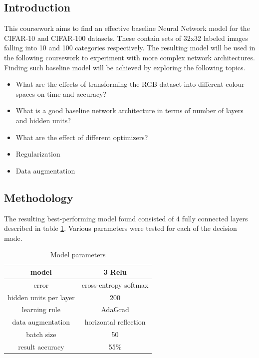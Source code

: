 \documentclass[12pt]{article}
\begin{document}
\maketitle


\subsection*{Introduction}
This coursework aims to find an effective baseline Neural Network model for the CIFAR-10 and CIFAR-100 datasets. These contain sets of 32x32 labeled images falling into 10 and 100 categories respectively. The resulting model will be used in the following coursework to experiment with more complex network architectures. Finding such baseline model will be achieved by exploring the following topics.
\begin{itemize}
\item What are the effects of transforming the RGB dataset into different colour spaces on time and accuracy?
\item What is a good baseline network architecture in terms of number of layers and hidden units?
\item  What are the effect of different optimizers?
\item Regularization
\item Data augmentation  
\end{itemize}

\subsection*{Methodology}

The resulting best-performing model found consisted of 4 fully connected layers described in table \ref{tab:model}. Various parameters were tested for each of the decision made. 

\begin{table}[H]
\centering
\begin{tabular}[h]{| c | c |}
\hline
model & 3 Relu  \\
\hline
error & cross-entropy softmax   \\
\hline
hidden units per layer & 200   \\
\hline
learning rule & AdaGrad   \\
\hline 
data augmentation & horizontal reflection  \\
\hline
batch size & 50   \\
\hline
result accuracy & 55\%   \\
\hline
\end{tabular} 
\caption{Model parameters}
\label{tab:model}
\end{table}
\end{document}
